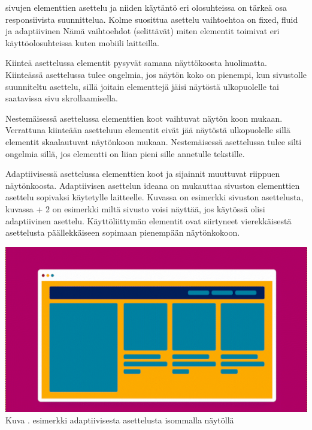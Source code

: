 \documentclass[11pt,a4paper,titlepage,oneside]{article}
\begin{document}

sivujen elementtien asettelu ja niiden käytäntö eri olosuhteissa on tärkeä osa responsiivista suunnittelua.
Kolme suosittua asettelu vaihtoehtoa on fixed, fluid ja adaptiivinen
Nämä vaihtoehdot (selittävät) miten elementit toimivat eri käyttöolosuhteissa kuten mobiili laitteilla.
\medskip



Kiinteä asettelussa elementit pysyvät samana näyttökoosta huolimatta. 
Kiinteässä asettelussa tulee ongelmia, jos näytön koko on pienempi, kun sivustolle suunniteltu asettelu, 
sillä joitain elementtejä jäisi näytöstä ulkopuolelle tai saatavissa sivu skrollaamisella.
\medskip


Nestemäisessä asettelussa elementtien koot vaihtuvat näytön koon mukaan. 
Verrattuna kiinteään asetteluun elementit eivät jää näytöstä ulkopuolelle sillä elementit skaalautuvat näytönkoon mukaan.
Nestemäisessä asettelussa tulee silti ongelmia sillä, jos elementti on liian pieni sille annetulle tekstille.
\medskip


Adaptiivisessä asettelussa elementtien koot ja sijainnit muuttuvat riippuen näytönkoosta.
Adaptiivisen asettelun ideana on mukauttaa sivuston elementtien asettelu sopivaksi käytetylle laitteelle.
Kuvassa \nextImageCount {} on esimerkki sivuston asettelusta, kuvassa {\the\numexpr \theimgCounter + 2 } on esimerkki miltä sivusto voisi näyttää, jos käytössä olisi adaptiivinen asettelu.
Käyttöliittymän elementit ovat siirtyneet vierekkäisestä asettelusta päällekkäiseen sopimaan pienempään näytönkokoon.
\medskip


\bigskip
\includegraphics[width = 15cm]{src/public/oppar/adaptiveBig.png}\\
Kuva \getImgCount {}. esimerkki adaptiivisesta asettelusta isommalla näytöllä 
 
\end{document}

